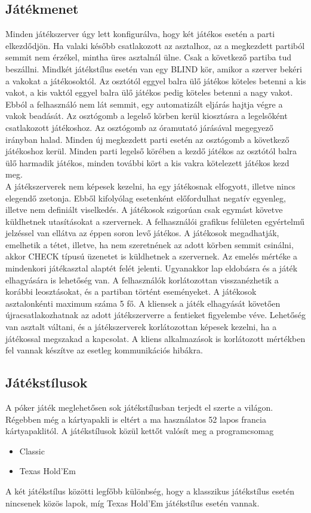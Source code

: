 \subsection{Játékmenet}
Minden játékszerver úgy lett konfigurálva, hogy két játékos esetén a parti elkezdődjön. Ha valaki később csatlakozott az asztalhoz, az a megkezdett partiból semmit nem érzékel, mintha üres asztalnál ülne. Csak a következő partiba tud beszállni. Mindkét játékstílus esetén van egy BLIND kör, amikor a szerver bekéri a vakokat a játékosoktól. Az osztótól eggyel balra ülő játékos köteles betenni a kis vakot, a kis vaktól eggyel balra ülő játékos pedig köteles betenni a nagy vakot. Ebból a felhasználó nem lát semmit, egy automatizált eljárás hajtja végre a vakok beadását. Az osztógomb  a legelső körben kerül kiosztásra a legelsőként csatlakozott játékoshoz. Az osztógomb az óramutató járásával megegyező irányban halad. Minden új megkezdett parti esetén az osztógomb a következő játékoshoz kerül. Minden parti legelső körében a kezdő játékos az osztótól balra ülő harmadik játékos, minden további kört a kis vakra kötelezett játékos kezd meg.  \\
A játékszerverek nem képesek kezelni, ha egy játékosnak elfogyott, illetve nincs elegendő zsetonja. Ebből kifolyólag esetenként előfordulhat negatív egyenleg, illetve nem definiált viselkedés. A játékosok szigorúan csak egymást követve küldhetnek utasításokat a szervernek. A felhasználói grafikus felületen egyértelmű jelzéssel van ellátva az éppen soron levő játékos. A játékosok megadhatják, emelhetik a tétet, illetve, ha nem szeretnének az adott körben semmit csinálni, akkor CHECK típusú üzenetet is küldhetnek a szervernek. Az emelés mértéke a mindenkori játékasztal alaptét felét jelenti. Ugyanakkor lap eldobásra és a játék elhagyására is lehetőség van. A felhasználók korlátozottan visszanézhetik a korábbi leosztásokat, és a partiban történt eseményeket. A játékosok asztalonkénti maximum száma 5 fő. A kliensek a játék elhagyását követően újracsatlakozhatnak az adott játékszerverre a fentieket figyelembe véve. Lehetőség van asztalt váltani, és a játékszerverek korlátozottan képesek kezelni, ha a játékossal megszakad a kapcsolat. A kliens alkalmazások is korlátozott mértékben fel vannak készítve az esetleg kommunikációs hibákra.

\subsection{Játékstílusok} \label{subsubsec:game_styles}
A póker játék meglehetősen sok játékstílusban terjedt el szerte a világon. Régebben még a kártyapakli is eltért a ma használatos 52 lapos francia kártyapaklitól. A játékstílusok közül kettőt valósít meg a programcsomag
\begin{itemize}[leftmargin=2cm]
\item Classic \cite{five_card_draw}
\item Texas Hold'Em \cite{texas_holdem}
\end{itemize}
A két játékstílus közötti legfőbb különbség, hogy a klasszikus játékstílus esetén nincsenek közös lapok, míg Texas Hold'Em játékstílus esetén vannak.

